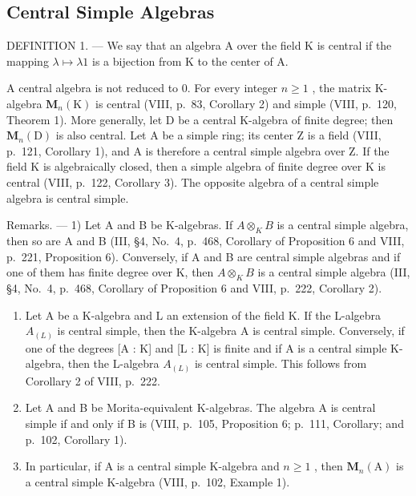 \subsection{Central Simple Algebras}

DEFINITION 1. --- We say that an algebra A over the field K is central if the mapping \(\lambda\mapsto\lambda1\) is a bijection from K to the center of A.

A central algebra is not reduced to 0. For every integer \(n \geqslant 1\) , the matrix K-algebra \(\mathbf{M}_{n}(\mathrm{K})\) is central (VIII, p.~83, Corollary 2) and simple (VIII, p.~120, Theorem 1). More generally, let D be a central K-algebra of finite degree; then \(\mathbf{M}_{n}(\mathrm{D})\) is also central. Let A be a simple ring; its center Z is a field (VIII, p.~121, Corollary 1), and A is therefore a central simple algebra over Z. If the field K is algebraically closed, then a simple algebra of finite degree over K is central (VIII, p.~122, Corollary 3). The opposite algebra of a central simple algebra is central simple.

Remarks. --- 1) Let A and B be K-algebras. If \(A \otimes_{K} B\) is a central simple algebra, then so are A and B (III, §4, No.~4, p.~468, Corollary of Proposition 6 and VIII, p.~221, Proposition 6). Conversely, if A and B are central simple algebras and if one of them has finite degree over K, then \(A \otimes_{K} B\) is a central simple algebra (III, §4, No.~4, p.~468, Corollary of Proposition 6 and VIII, p.~222, Corollary 2).

\begin{enumerate}
\def\labelenumi{\arabic{enumi})}
\setcounter{enumi}{1}
\item
  Let A be a K-algebra and L an extension of the field K. If the L-algebra \(A_{(L)}\) is central simple, then the K-algebra A is central simple. Conversely, if one of the degrees {[}A : K{]} and {[}L : K{]} is finite and if A is a central simple K-algebra, then the L-algebra \(A_{(L)}\) is central simple. This follows from Corollary 2 of VIII, p.~222.
\item
  Let A and B be Morita-equivalent K-algebras. The algebra A is central simple if and only if B is (VIII, p.~105, Proposition 6; p.~111, Corollary; and p.~102, Corollary 1).
\item
  In particular, if A is a central simple K-algebra and \(n \geqslant 1\) , then \(\mathbf{M}_{n}(\mathrm{A})\) is a central simple K-algebra (VIII, p.~102, Example 1).
\end{enumerate}

